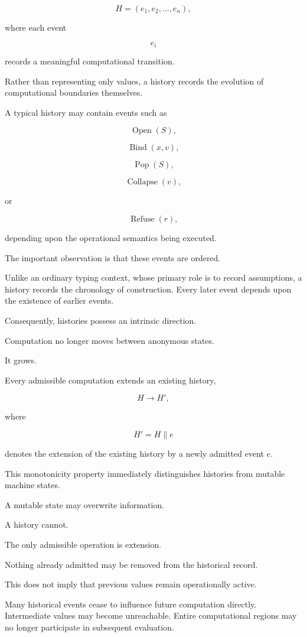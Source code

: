\documentclass[12pt,oneside]{article}
\theoremstyle{definition}
\theoremstyle{remark}
\begin{document}
\[
H=(e_1,e_2,\ldots,e_n),
\]

where each event

\[
e_i
\]

records a meaningful computational transition.

Rather than representing only values, a history records the evolution of
computational boundaries themselves.

A typical history may contain events such as

\[
\operatorname{Open}(S),
\]

\[
\operatorname{Bind}(x,v),
\]

\[
\operatorname{Pop}(S),
\]

\[
\operatorname{Collapse}(v),
\]

or

\[
\operatorname{Refuse}(r),
\]

depending upon the operational semantics being executed.

The important observation is that these events are ordered.

Unlike an ordinary typing context, whose primary role is to record assumptions,
a history records the chronology of construction. Every later event depends
upon the existence of earlier events.

Consequently, histories possess an intrinsic direction.

Computation no longer moves between anonymous states.

It grows.

Every admissible computation extends an existing history,

\[
H
\longrightarrow
H',
\]

where

\[
H'
=
H
\mathbin{\|}e
\]

denotes the extension of the existing history by a newly admitted event
\(e\).

This monotonicity property immediately distinguishes histories from mutable
machine states.

A mutable state may overwrite information.

A history cannot.

The only admissible operation is extension.

Nothing already admitted may be removed from the historical record.

This does not imply that previous values remain operationally active.

Many historical events cease to influence future computation directly.
Intermediate values may become unreachable.
Entire computational regions may no longer participate in subsequent
evaluation.
\end{document}
